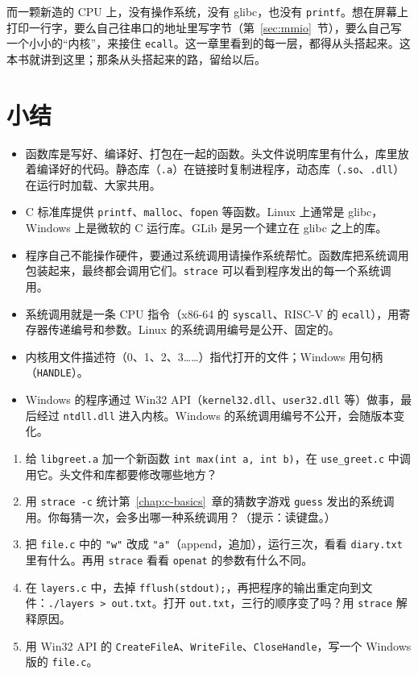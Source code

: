 而一颗新造的 CPU 上，没有操作系统，没有 glibc，也没有 \texttt{printf}。想在屏幕上打印一行字，要么自己往串口的地址里写字节（第~\ref{sec:mmio}~节），要么自己写一个小小的“内核”，来接住 \texttt{ecall}。这一章里看到的每一层，都得从头搭起来。这本书就讲到这里；那条从头搭起来的路，留给以后。

\section{小结}

\begin{itemize}
  \item 函数库是写好、编译好、打包在一起的函数。头文件说明库里有什么，库里放着编译好的代码。静态库（\texttt{.a}）在链接时复制进程序，动态库（\texttt{.so}、\texttt{.dll}）在运行时加载、大家共用。
  \item C 标准库提供 \texttt{printf}、\texttt{malloc}、\texttt{fopen} 等函数。Linux 上通常是 glibc，Windows 上是微软的 C 运行库。GLib 是另一个建立在 glibc 之上的库。
  \item 程序自己不能操作硬件，要通过系统调用请操作系统帮忙。函数库把系统调用包装起来，最终都会调用它们。\texttt{strace} 可以看到程序发出的每一个系统调用。
  \item 系统调用就是一条 CPU 指令（x86-64 的 \texttt{syscall}、RISC-V 的 \texttt{ecall}），用寄存器传递编号和参数。Linux 的系统调用编号是公开、固定的。
  \item 内核用文件描述符（0、1、2、3……）指代打开的文件；Windows 用句柄（\texttt{HANDLE}）。
  \item Windows 的程序通过 Win32 API（\texttt{kernel32.dll}、\texttt{user32.dll} 等）做事，最后经过 \texttt{ntdll.dll} 进入内核。Windows 的系统调用编号不公开，会随版本变化。
\end{itemize}


\begin{enumerate}
  \item 给 \texttt{libgreet.a} 加一个新函数 \texttt{int max(int a, int b)}，在 \texttt{use\_greet.c} 中调用它。头文件和库都要修改哪些地方？
  \item 用 \texttt{strace -c} 统计第~\ref{chap:c-basics}~章的猜数字游戏 \texttt{guess} 发出的系统调用。你每猜一次，会多出哪一种系统调用？（提示：读键盘。）
  \item 把 \texttt{file.c} 中的 \texttt{"w"} 改成 \texttt{"a"}（append，追加），运行三次，看看 \texttt{diary.txt} 里有什么。再用 \texttt{strace} 看看 \texttt{openat} 的参数有什么不同。
  \item 在 \texttt{layers.c} 中，去掉 \texttt{fflush(stdout);}，再把程序的输出重定向到文件：\texttt{./layers > out.txt}。打开 \texttt{out.txt}，三行的顺序变了吗？用 \texttt{strace} 解释原因。
  \item 用 Win32 API 的 \texttt{CreateFileA}、\texttt{WriteFile}、\texttt{CloseHandle}，写一个 Windows 版的 \texttt{file.c}。
\end{enumerate}
